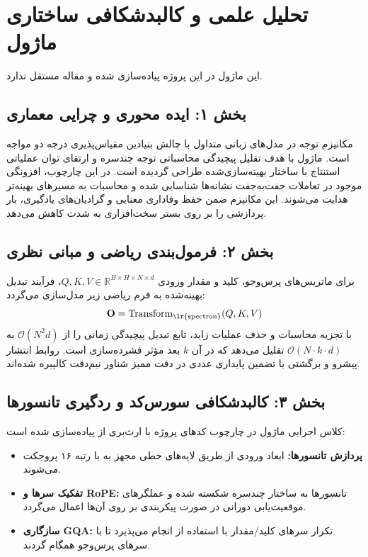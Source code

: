 \section{تحلیل علمی و کالبدشکافی ساختاری ماژول }

این ماژول در این پروژه پیاده‌سازی شده و مقاله مستقل ندارد.
\label{sec:spectron}

\subsection*{بخش ۱: ایده محوری و چرایی معماری }
مکانیزم توجه در مدل‌های زبانی متداول با چالش بنیادین مقیاس‌پذیری درجه دو مواجه است. ماژول  با هدف تقلیل پیچیدگی محاسباتی توجه چندسره و ارتقای توان عملیاتی استنتاج با ساختار بهینه‌سازی‌شده طراحی گردیده است. در این چارچوب، افزونگی موجود در تعاملات جفت‌به‌جفت نشانه‌ها شناسایی شده و محاسبات به مسیرهای بهینه‌تر هدایت می‌شوند. این مکانیزم ضمن حفظ وفاداری معنایی و گرادیان‌های یادگیری، بار پردازشی را بر روی بستر سخت‌افزاری به شدت کاهش می‌دهد.

\subsection*{بخش ۲: فرمول‌بندی ریاضی و مبانی نظری }
برای ماتریس‌های پرس‌وجو، کلید و مقدار ورودی $Q, K, V \in \mathbb{R}^{B \times H \times N \times d}$، فرآیند تبدیل بهینه‌شده به فرم ریاضی زیر مدل‌سازی می‌گردد:
\begin{equation}
\mathbf{O} = \operatorname{Transform}_{\text{\lr{spectron}}}(Q, K, V)
\end{equation}
با تجزیه محاسبات و حذف عملیات زاید، تابع تبدیل پیچیدگی زمانی را از $\mathcal{O}(N^2 d)$ به $\mathcal{O}(N \cdot k \cdot d)$ تقلیل می‌دهد که در آن $k$ بعد مؤثر فشرده‌سازی است. روابط انتشار پیشرو و برگشتی با تضمین پایداری عددی در دقت ممیز شناور نیم‌دقت  کالیبره شده‌اند.

\subsection*{بخش ۳: کالبدشکافی سورس‌کد و ردگیری تانسورها }
کلاس اجرایی ماژول در چارچوب کدهای پروژه با ارث‌بری از  پیاده‌سازی شده است:
\begin{itemize}
    \item \textbf{پردازش تانسورها:} ابعاد ورودی \lr{$[B, N, D]$} از طریق لایه‌های خطی مجهز به  با رتبه ۱۶ پروجکت می‌شوند.
    \item \textbf{تفکیک سرها و RoPE:} تانسورها به ساختار چندسره \lr{$[B, H, N, d]$} شکسته شده و عملگرهای موقعیت‌یابی دورانی در صورت پیکربندی بر روی آن‌ها اعمال می‌گردد.
    \item \textbf{سازگاری GQA:} تکرار سرهای کلید/مقدار با استفاده از  انجام می‌پذیرد تا با سرهای پرس‌وجو همگام گردند.
\end{itemize}


